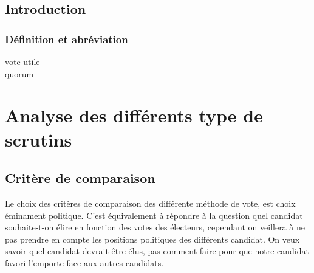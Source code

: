 \documentclass[../report]{subfiles}
\begin{document}
\newcommand\tabcritere[8]{
  \begin{center}
    \begin{tabular}{r|c|p{20em}}
      \hline
      Critère & Évaluation & Raison \\
      \hline
      \hline
      Avis des perdants & #1 & #2 \\
      \hline
      Indépendance aux petits candidats & #3 & #4 \\
      \hline
      Quasi unanimité du vote & #5 & #6 \\
      \hline
      Manipulabilité & #7 & #8 \\
      \hline
    \end{tabular}
  \end{center}
}


  \chapter{Introduction}


  \section{Définition et abréviation}
  
  \begin{description}
    \item[vote utile] 
    \item[quorum]
  \end{description}

  \part{Analyse des différents type de scrutins}

  \chapter{Critère de comparaison}
  
  Le choix des critères de comparaison des différente méthode de vote, est choix 
  éminament politique.
  C'est équivalement à répondre à la question quel candidat souhaite-t-on élire en fonction
  des votes des électeurs, cependant on veillera à ne pas prendre en compte les positions 
  politiques des différents candidat.
  On veux savoir quel candidat devrait être élus, pas comment faire pour que notre candidat 
  favori l'emporte face aux autres candidats.
\end{document}
